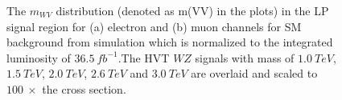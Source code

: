 \begin{figure}[h]
	\centering
	\caption{The $m_{WV}$ distribution (denoted as m(VV) in the plots) in the LP signal region for (a) electron and (b) muon channels for SM background from simulation which is normalized to the integrated luminosity of $36.5~fb^{-1}$.The HVT $WZ$ signals with mass of $1.0~TeV$, $1.5~TeV$, $2.0~TeV$, $2.6~TeV$ and $3.0~TeV$ are overlaid and
	scaled to $100 ~\times$ the cross section.}
	\label{Fig:LowPuritySR}
\end{figure}
%

